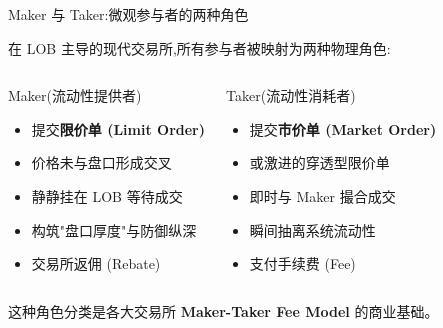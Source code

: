 \documentclass[10pt,aspectratio=169]{beamer}
\begin{document}
\begin{frame}{Maker 与 Taker:微观参与者的两种角色}

  在 LOB 主导的现代交易所,所有参与者被映射为两种物理角色:

  \vfill

  \begin{columns}[t]
    \begin{block}{Maker(流动性提供者)}
      \begin{itemize}
        \item 提交\textbf{限价单 (Limit Order)}
        \item 价格未与盘口形成交叉
        \item 静静挂在 LOB 等待成交
        \item 构筑"盘口厚度"与防御纵深
        \item \textcolor{quantgreen}{交易所返佣 (Rebate)}
      \end{itemize}
    \end{block}

    \begin{block}{Taker(流动性消耗者)}
      \begin{itemize}
        \item 提交\textbf{市价单 (Market Order)}
        \item 或激进的穿透型限价单
        \item 即时与 Maker 撮合成交
        \item 瞬间抽离系统流动性
        \item \textcolor{quantred}{支付手续费 (Fee)}
      \end{itemize}
    \end{block}
  \end{columns}

  \vfill

  \centering\small
  这种角色分类是各大交易所 \textbf{Maker-Taker Fee Model} 的商业基础。

\end{frame}
\end{document}
